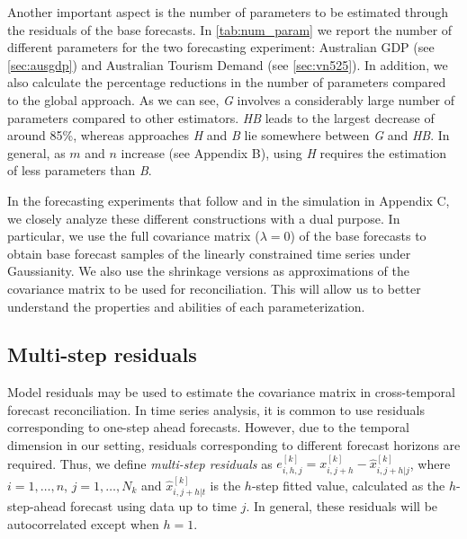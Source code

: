 \documentclass[a4paper,11pt]{article}
\theoremstyle{definition}
\begin{document}
Another important aspect is the number of parameters to be estimated through the residuals of the base forecasts. In \autoref{tab:num_param} we report the number of different parameters %
for the two forecasting experiment: Australian GDP (see \autoref{sec:ausgdp}) and Australian Tourism Demand (see \autoref{sec:vn525}). In addition, we also calculate the percentage reductions in the number of parameters compared to the global approach. %
As we can see, \textit{G} involves a considerably large number of parameters compared to other estimators. \textit{HB} leads to the largest decrease of around 85\%, whereas approaches \textit{H} and \textit{B}  lie somewhere between \textit{G} and \textit{HB}. In general, as $m$ and $n$ increase (see Appendix B), using \textit{H} requires the estimation of less parameters than \textit{B}.

In the forecasting experiments that follow and in the simulation in Appendix C, we closely analyze these different constructions with a dual purpose. In particular, we use the full covariance matrix ($\lambda = 0$) of the base forecasts to obtain base forecast samples of the linearly constrained time series under Gaussianity. We also use the shrinkage versions as approximations of the covariance matrix to be used for reconciliation. This will allow us to better understand the properties and abilities of each parameterization.


\subsection{Multi-step residuals} \label{ssec:multi_res}

Model residuals may be used to estimate the covariance matrix in cross-temporal forecast reconciliation. In time series analysis, it is common to use residuals corresponding to one-step ahead forecasts. However, due to the temporal dimension in our setting, residuals corresponding to different forecast horizons are required. Thus, we define \textit{multi-step residuals} as $e_{i,h,j}^{[k]} = x_{i,j+h}^{[k]} - \widehat{x}_{i,j+h|j}^{[k]}$, where $i = 1,\dots,n$, $j = 1,\dots,N_k$ and $\widehat{x}_{i,j+h|t}^{[k]}$ is the $h$-step fitted value, calculated as the $h$-step-ahead forecast using data up to time $j$. In general, these residuals will be autocorrelated except when $h=1$.
\end{document}
